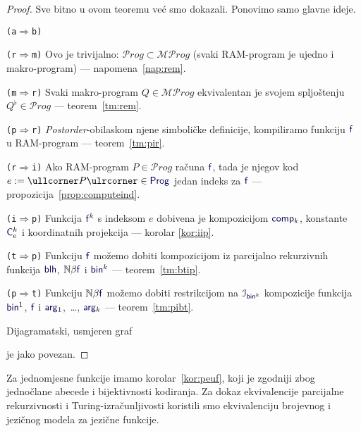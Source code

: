 \begin{proof}
Sve bitno u ovom teoremu već smo dokazali. Ponovimo samo glavne ideje.

\begin{labeling}{\texttt{(a$\Rightarrow$b)}}
    \item[\texttt{(r$\Rightarrow$m)}] Ovo je trivijalno: $\mathscr Prog\subset\mathscr{MP}rog$ (svaki RAM-program je ujedno i makro-program) --- napomena~\ref{nap:rem}.
    \item[\texttt{(m$\Rightarrow$r)}] Svaki makro-program $Q\in\mathscr{MP}rog$ ekvivalentan je svojem spljoštenju $Q^\flat\in\mathscr Prog$ --- teorem~\ref{tm:rem}.
    \item[\texttt{(p$\Rightarrow$r)}] \emph{Postorder}-obilaskom njene simboličke definicije, kompiliramo funkciju $\f f$ u RAM-program --- teorem~\ref{tm:pir}.
    \item[\texttt{(r$\Rightarrow$i)}] Ako RAM-program $P\in\mathscr Prog$ računa $\f f$, tada je njegov kod $e:=\kprog P\in\f{Prog}$ jedan indeks za $ \f f$ --- propozicija~\ref{prop:computeind}.
    \item[\texttt{(i$\Rightarrow$p)}] Funkcija $\f f^k$ s indeksom $e$ dobivena je kompozicijom $\f{comp}_k$, konstante $\f C_e^k$ i koordinatnih projekcija --- korolar \ref{kor:iip}.
    \item[\texttt{(t$\Rightarrow$p)}] Funkciju $\f f$ možemo dobiti kompozicijom iz parcijalno rekurzivnih funkcija $\f{blh}$, $\N\beta\f f$ i $\f{bin}^k$ --- teorem~\ref{tm:btip}.
    \item[\texttt{(p$\Rightarrow$t)}] Funkciju $\N\beta\f f$ možemo dobiti restrikcijom na $\im{\f{bin}^k}$ kompozicije funkcija $\f{bin}^1$, $\f f$ i $\f{arg}_1$,~\ldots, $\f{arg}_k$ --- teorem~\ref{tm:pibt}.
\end{labeling}
Dijagramatski, usmjeren graf
 je jako povezan.
\end{proof}

Za jednomjesne funkcije imamo korolar~\ref{kor:peuf}, koji je zgodniji zbog jednočlane abecede i bijektivnosti kodiranja. Za dokaz ekvivalencije parcijalne rekurzivnosti i Turing-izračunljivosti koristili smo ekvivalenciju brojevnog i jezičnog modela za jezične funkcije.

